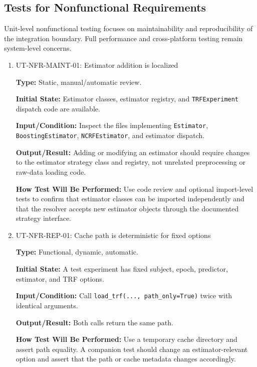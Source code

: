 \documentclass[12pt, titlepage]{article}
\begin{document}
\subsection{Tests for Nonfunctional Requirements}

Unit-level nonfunctional testing focuses on maintainability and reproducibility of the integration boundary. Full performance and cross-platform testing remain system-level concerns.

\begin{enumerate}

\item{UT-NFR-MAINT-01: Estimator addition is localized\\}

\textbf{Type:} Static, manual/automatic review.

\textbf{Initial State:} Estimator classes, estimator registry, and \texttt{TRFExperiment} dispatch code are available.

\textbf{Input/Condition:} Inspect the files implementing \texttt{Estimator}, \texttt{BoostingEstimator}, \texttt{NCRFEstimator}, and estimator dispatch.

\textbf{Output/Result:} Adding or modifying an estimator should require changes to the estimator strategy class and registry, not unrelated preprocessing or raw-data loading code.

\textbf{How Test Will Be Performed:} Use code review and optional import-level tests to confirm that estimator classes can be imported independently and that the resolver accepts new estimator objects through the documented strategy interface.

\item{UT-NFR-REP-01: Cache path is deterministic for fixed options\\}

\textbf{Type:} Functional, dynamic, automatic.

\textbf{Initial State:} A test experiment has fixed subject, epoch, predictor, estimator, and TRF options.

\textbf{Input/Condition:} Call \texttt{load\_trf(..., path\_only=True)} twice with identical arguments.

\textbf{Output/Result:} Both calls return the same path.

\textbf{How Test Will Be Performed:} Use a temporary cache directory and assert path equality. A companion test should change an estimator-relevant option and assert that the path or cache metadata changes accordingly.

\end{enumerate}
\end{document}
